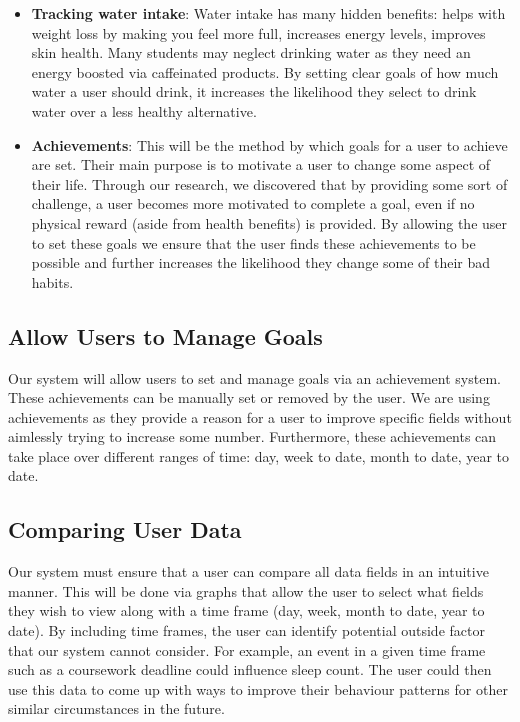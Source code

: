\documentclass[12pt]{article}
\begin{document}
\begin{itemize}
    \item \textbf{Tracking water intake}: Water intake has many hidden benefits: helps with weight loss by making you feel more full, increases energy levels, improves skin health. Many students may neglect drinking water as they need an energy boosted via caffeinated products. By setting clear goals of how much water a user should drink, it increases the likelihood they select to drink water over a less healthy alternative.

    \item \textbf{Achievements}: This will be the method by which goals for a user to achieve are set. Their main purpose is to motivate a user to change some aspect of their life. Through our research, we discovered that by providing some sort of challenge, a user becomes more motivated to complete a goal, even if no physical reward (aside from health benefits) is provided. By allowing the user to set these goals we ensure that the user finds these achievements to be possible and further increases the likelihood they change some of their bad habits.

\end{itemize}


\subsection{Allow Users to Manage Goals}

Our system will allow users to set and manage goals via an achievement system. These achievements can be manually set or removed by the user. We are using achievements as they provide a reason for a user to improve specific fields without aimlessly trying to increase some number. Furthermore, these achievements can take place over different ranges of time: day, week to date, month to date, year to date.


\subsection{Comparing User Data}

Our system must ensure that a user can compare all data fields in an intuitive manner. This will be done via graphs that allow the user to select what fields they wish to view along with a time frame (day, week, month to date, year to date).
By including time frames, the user can identify potential outside factor that our system cannot consider. For example, an event in a given time frame such as a coursework deadline could influence sleep count. The user could then use this data to come up with ways to improve their behaviour patterns for other similar circumstances in the future.
\end{document}
